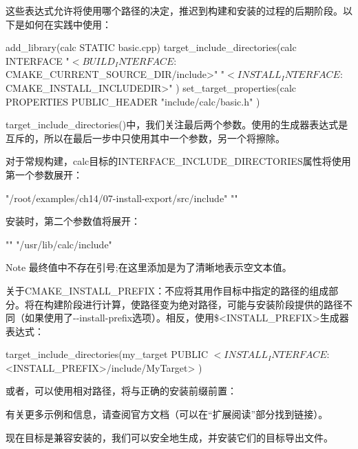 这些表达式允许将使用哪个路径的决定，推迟到构建和安装的过程的后期阶段。以下是如何在实践中使用：


\begin{cmake}
add_library(calc STATIC basic.cpp)
target_include_directories(calc INTERFACE
    "$<BUILD_INTERFACE:${CMAKE_CURRENT_SOURCE_DIR}/include>"
    "$<INSTALL_INTERFACE:${CMAKE_INSTALL_INCLUDEDIR}>"
)
set_target_properties(calc PROPERTIES
    PUBLIC_HEADER "include/calc/basic.h"
)
\end{cmake}

target\_include\_directories()中，我们关注最后两个参数。使用的生成器表达式是互斥的，所以在最后一步中只使用其中一个参数，另一个将擦除。

对于常规构建，calc目标的INTERFACE\_INCLUDE\_DIRECTORIES属性将使用第一个参数展开：

\begin{cmake}
"/root/examples/ch14/07-install-export/src/include" ""
\end{cmake}

安装时，第二个参数值将展开：

\begin{cmake}
"" "/usr/lib/calc/include"
\end{cmake}

\begin{myNotic}{Note}
最终值中不存在引号;在这里添加是为了清晰地表示空文本值。
\end{myNotic}

关于CMAKE\_INSTALL\_PREFIX：不应将其用作目标中指定的路径的组成部分。将在构建阶段进行计算，使路径变为绝对路径，可能与安装阶段提供的路径不同（如果使用了-{}-install-prefix选项）。相反，使用\$<INSTALL\_PREFIX>生成器表达式：

\begin{cmake}
target_include_directories(my_target PUBLIC
    $<INSTALL_INTERFACE:$<INSTALL_PREFIX>/include/MyTarget>
)
\end{cmake}

或者，可以使用相对路径，将与正确的安装前缀前置：


有关更多示例和信息，请查阅官方文档（可以在“扩展阅读”部分找到链接）。

现在目标是兼容安装的，我们可以安全地生成，并安装它们的目标导出文件。

